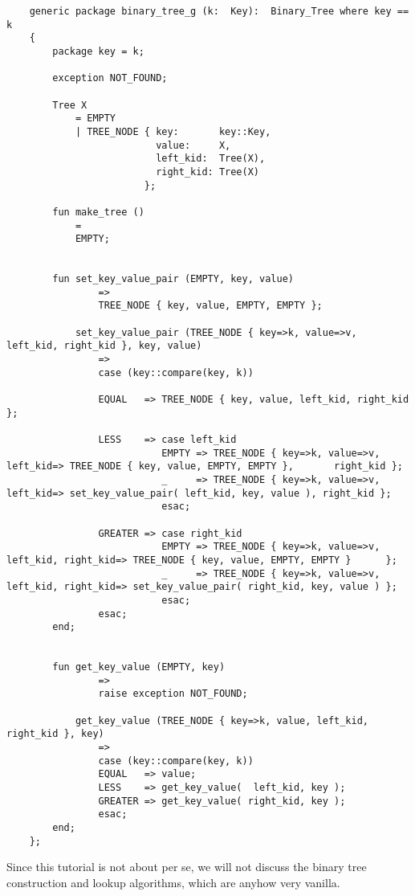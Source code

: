 \begin{verbatim}
    generic package binary_tree_g (k:  Key):  Binary_Tree where key == k
    {
        package key = k;

        exception NOT_FOUND;

        Tree X
            = EMPTY
            | TREE_NODE { key:       key::Key,
                          value:     X,
                          left_kid:  Tree(X),
                          right_kid: Tree(X)
                        };

        fun make_tree ()
            =
            EMPTY;


        fun set_key_value_pair (EMPTY, key, value)
                =>
                TREE_NODE { key, value, EMPTY, EMPTY };

            set_key_value_pair (TREE_NODE { key=>k, value=>v, left_kid, right_kid }, key, value)
                =>
                case (key::compare(key, k))

                EQUAL   => TREE_NODE { key, value, left_kid, right_kid };

                LESS    => case left_kid
                           EMPTY => TREE_NODE { key=>k, value=>v, left_kid=> TREE_NODE { key, value, EMPTY, EMPTY },       right_kid };
                           _     => TREE_NODE { key=>k, value=>v, left_kid=> set_key_value_pair( left_kid, key, value ), right_kid };
                           esac; 

                GREATER => case right_kid
                           EMPTY => TREE_NODE { key=>k, value=>v, left_kid, right_kid=> TREE_NODE { key, value, EMPTY, EMPTY }      };
                           _     => TREE_NODE { key=>k, value=>v, left_kid, right_kid=> set_key_value_pair( right_kid, key, value ) };
                           esac; 
                esac;
        end;


        fun get_key_value (EMPTY, key)
                =>
                raise exception NOT_FOUND;

            get_key_value (TREE_NODE { key=>k, value, left_kid, right_kid }, key)
                =>
                case (key::compare(key, k))
                EQUAL   => value;
                LESS    => get_key_value(  left_kid, key );
                GREATER => get_key_value( right_kid, key );
                esac;
        end;
    };
\end{verbatim}

Since this tutorial is not about 
 per se, we will not discuss 
the binary tree construction and lookup algorithms, which are anyhow very vanilla.

